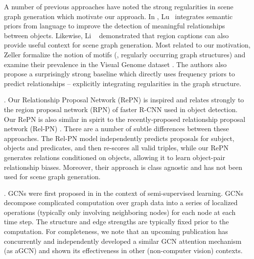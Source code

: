A number of previous approaches have noted the strong regularities in scene graph generation which motivate our approach.
In \cite{lu2016visual}, Lu \etal ~integrates semantic priors from language to improve the detection of meaningful relationships between objects. Likewise, Li \etal ~\cite{li2017scene} demonstrated that region captions can also provide useful context for scene graph generation. Most related to our motivation, Zeller \etal \cite{zellers2017neural} formalize the notion of motifs (\ie, regularly occurring graph structures) and examine their prevalence in the Visual Genome dataset \cite{krishna2017visual}. The authors also propose a surprisingly strong baseline which directly uses frequency priors to predict relationships -- explicitly integrating regularities in the graph structure. 

. Our Relationship Proposal Network  (RePN) is inspired and relates strongly to the region proposal network (RPN) of faster R-CNN \cite{ren2015faster} used in object detection. Our RePN is also similar in spirit to the recently-proposed relationship proposal network (Rel-PN) \cite{zhang2017relationship}. There are a number of subtle differences between these approaches. The Rel-PN model independently predicts proposals for subject, objects and predicates, and then re-scores all valid triples, while our RePN generates relations conditioned on objects, allowing it to learn object-pair relationship biases. Moreover, their approach is class agnostic and has not been used for scene graph generation. 

. GCNs were first proposed in \cite{kipf2016semi} in the context of semi-supervised learning. GCNs decompose complicated computation over graph data into a series of localized operations (typically only involving neighboring nodes) for each node at each time step. The structure and edge strengths are typically fixed prior to the computation. 
%
For completeness, we note that an upcoming publication \cite{velivckovic2017graph} has concurrently and independently developed a similar GCN attention mechanism (as aGCN) and shown its effectiveness in other (non-computer vision) contexts.